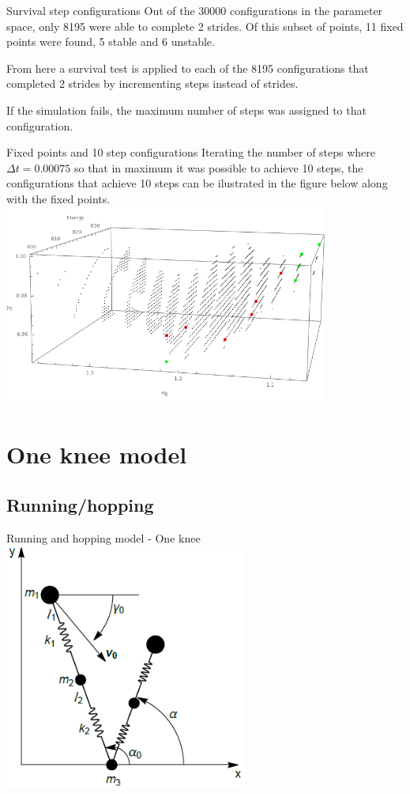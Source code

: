 \documentclass{beamer}
\begin{document}
\begin{frame}{Survival step configurations}
  Out of the 30000 configurations in the parameter space, only 8195 were able to complete 2 strides. Of this subset of points, 11 fixed points were found, 5 stable and 6 unstable.
  
  From here a survival test is applied to each of the 8195 configurations that completed 2 strides by incrementing steps instead of strides.

  If the simulation fails, the maximum number of steps was assigned to that configuration.
\end{frame}

\begin{frame}{Fixed points and 10 step configurations}
  Iterating the number of steps where $\Delta t=0.00075$ so that in maximum it was possible to achieve 10 steps, the configurations that achieve 10 steps can be ilustrated in the figure below along with the fixed points.
  \includegraphics[width=0.8\textwidth]{newfixedpoints.png}


\end{frame}
\section{One knee model}
\subsection{Running/hopping}
\begin{frame}{Running and hopping model - One knee}
  \centering
    \includegraphics[width=0.6\textwidth]{initialphase.png}
\end{frame}
\end{document}
